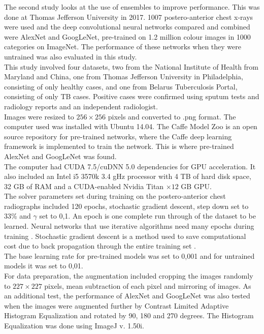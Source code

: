 The second study looks at the use of ensembles to improve performance. This was done at Thomas Jefferson University in 2017. 1007 postero-anterior chest x-rays were used and the deep convolutional neural networks compared and combined were AlexNet and GoogLeNet, pre-trained on 1.2 million colour images in 1000 categories on ImageNet. The performance of these networks when they were untrained was also evaluated in this study.\newline
\\
This study involved four datasets, two from the National Institute of Health from Maryland and China, one from Thomas Jefferson University in Philadelphia, consisting of only healthy cases, and one from Belarus Tuberculosis Portal, consisting of only TB cases. Positive cases were confirmed using sputum tests and radiology reports and an independent radiologist.\newline
\\
Images were resized to $256\times256$ pixels and converted to .png format. The computer used was installed with Ubuntu 14.04. The Caffe Model Zoo is an open source repository for pre-trained networks, where the Caffe deep learning framework is implemented to train the network. This is where pre-trained AlexNet and GoogLeNet was found.\newline
\\
The computer had CUDA 7.5/cuDNN 5.0 dependencies for GPU acceleration. It also included an Intel i5 3570k 3.4 gHz processor with 4 TB of hard disk space, 32 GB of RAM and a CUDA-enabled Nvidia Titan $\times12$ GB GPU.\newline
\\
The solver parameters set during training on the postero-anterior chest radiographs included 120 epochs, stochastic gradient descent, step down set to 33\% and $\gamma$ set to 0,1. An epoch is one complete run through of the dataset to be learned. Neural networks that use iterative algorithms need many epochs during training \cite{22}. Stochastic gradient descent is a method used to save computational cost due to back propagation through the entire training set \cite{19}.  \newline 
\\
The base learning rate for pre-trained models was set to 0,001 and for untrained models it was set to 0,01.\newline
\\
For data preparation, the augmentation included cropping the images randomly to $227\times227$ pixels, mean subtraction of each pixel and mirroring of images. As an additional test, the performance of AlexNet and GoogLeNet was also tested when the images were augmented further by Contrast Limited Adaptive Histogram Equalization and rotated by 90, 180 and 270 degrees. The Histogram Equalization was done using ImageJ v. 1.50i.\newline
